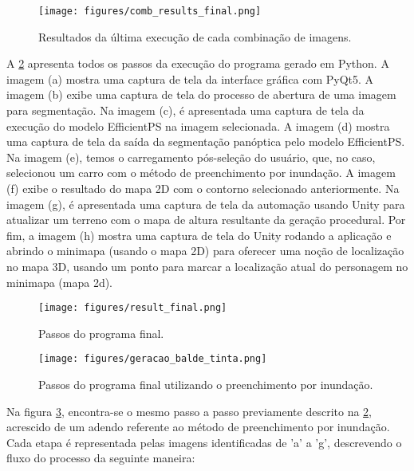 \begin{figure}[!ht]
	\centering
    \caption{Resultados da última execução de cada combinação de imagens.}
	\texttt{[image: figures/comb\_results\_final.png]}
	\label{fig:result_final}
\end{figure}

A \cref{fig:combs_result} apresenta todos os passos da execução do programa gerado em Python. A imagem (a) mostra uma captura de tela da interface gráfica com PyQt5. A imagem (b) exibe uma captura de tela do processo de abertura de uma imagem para segmentação. Na imagem (c), é apresentada uma captura de tela da execução do modelo EfficientPS na imagem selecionada. A imagem (d) mostra uma captura de tela da saída da segmentação panóptica pelo modelo EfficientPS. Na imagem (e), temos o carregamento pós-seleção do usuário, que, no caso, selecionou um carro com o método de preenchimento por inundação. A imagem (f) exibe o resultado do mapa 2D com o contorno selecionado anteriormente. Na imagem (g), é apresentada uma captura de tela da automação usando Unity para atualizar um terreno com o mapa de altura resultante da geração procedural. Por fim, a imagem (h) mostra uma captura de tela do Unity rodando a aplicação e abrindo o minimapa (usando o mapa 2D) para oferecer uma noção de localização no mapa 3D, usando um ponto para marcar a localização atual do personagem no minimapa (mapa 2d).


\begin{figure}[!ht]
	\centering
    \caption{Passos do programa final.}
	\texttt{[image: figures/result\_final.png]}
	\label{fig:combs_result}
\end{figure}

\newpage

\begin{figure}[!ht]
	\centering
    \caption{Passos do programa final utilizando o preenchimento por inundação.}
	\texttt{[image: figures/geracao\_balde\_tinta.png]}
	\label{fig:combs_result_2}
\end{figure}

\pagebreak

Na figura \cref{fig:combs_result_2}, encontra-se o mesmo passo a passo previamente descrito na \cref{fig:combs_result}, acrescido de um adendo referente ao método de preenchimento por inundação. Cada etapa é representada pelas imagens identificadas de 'a' a 'g', descrevendo o fluxo do processo da seguinte maneira:

